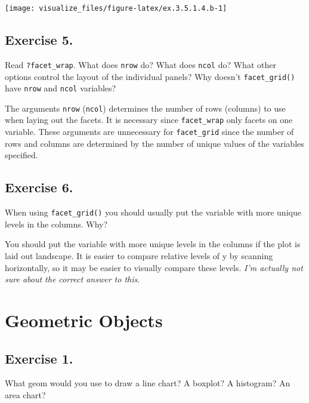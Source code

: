 \documentclass[]{book}
\theoremstyle{definition}
\theoremstyle{definition}
\theoremstyle{definition}
\theoremstyle{remark}
\begin{document}
\begin{center}\texttt{[image: visualize\_files/figure-latex/ex.3.5.1.4.b-1]} \end{center}

\hypertarget{exercise-5.-2}{%
\subsection{Exercise 5.}\label{exercise-5.-2}}

Read \texttt{?facet\_wrap}. What does \texttt{nrow} do? What does
\texttt{ncol} do? What other options control the layout of the
individual panels? Why doesn't \texttt{facet\_grid()} have \texttt{nrow}
and \texttt{ncol} variables?

The arguments \texttt{nrow} (\texttt{ncol}) determines the number of
rows (columns) to use when laying out the facets. It is necessary since
\texttt{facet\_wrap} only facets on one variable. These arguments are
unnecessary for \texttt{facet\_grid} since the number of rows and
columns are determined by the number of unique values of the variables
specified.

\hypertarget{exercise-6.-1}{%
\subsection{Exercise 6.}\label{exercise-6.-1}}

When using \texttt{facet\_grid()} you should usually put the variable
with more unique levels in the columns. Why?

You should put the variable with more unique levels in the columns if
the plot is laid out landscape. It is easier to compare relative levels
of y by scanning horizontally, so it may be easier to visually compare
these levels. \emph{I'm actually not sure about the correct answer to
this}.

\hypertarget{geometric-objects}{%
\section{Geometric Objects}\label{geometric-objects}}

\hypertarget{exercise-1.-3}{%
\subsection{Exercise 1.}\label{exercise-1.-3}}

What geom would you use to draw a line chart? A boxplot? A histogram? An
area chart?
\end{document}
